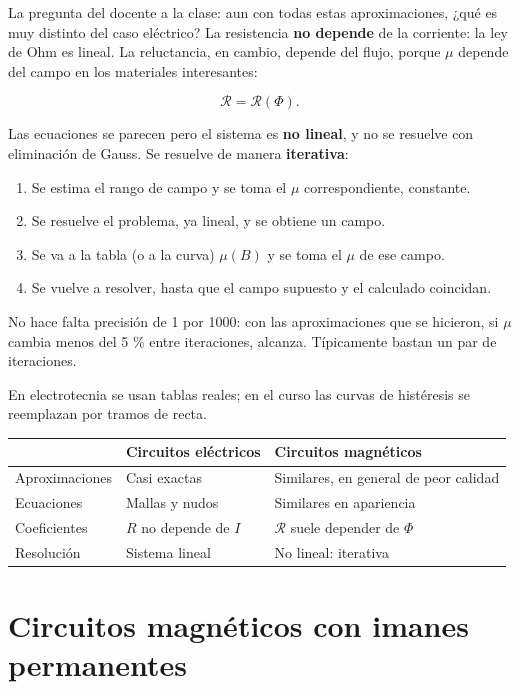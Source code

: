 \documentclass[12pt,a4paper]{article}
\begin{document}
La pregunta del docente a la clase: aun con todas estas aproximaciones, ¿qué es
muy distinto del caso eléctrico? La resistencia \textbf{no depende} de la corriente:
la ley de Ohm es lineal. La reluctancia, en cambio, depende del flujo, porque
$\mu$ depende del campo en los materiales interesantes:

\[
\mathcal{R} = \mathcal{R}(\Phi) .
\]

Las ecuaciones se parecen pero el sistema es \textbf{no lineal}, y no se resuelve
con eliminación de Gauss. Se resuelve de manera \textbf{iterativa}:

\begin{enumerate}
  \item Se estima el rango de campo y se toma el $\mu$ correspondiente, constante.
  \item Se resuelve el problema, ya lineal, y se obtiene un campo.
  \item Se va a la tabla (o a la curva) $\mu(B)$ y se toma el $\mu$ de ese campo.
  \item Se vuelve a resolver, hasta que el campo supuesto y el calculado coincidan.
\end{enumerate}

No hace falta precisión de 1 por 1000: con las aproximaciones que se hicieron,
si $\mu$ cambia menos del 5 \% entre iteraciones, alcanza. Típicamente bastan un
par de iteraciones.

En electrotecnia se usan tablas reales; en el curso las curvas de histéresis se
reemplazan por tramos de recta.

\begin{center}
\renewcommand{\arraystretch}{1.35}
\small
\begin{tabularx}{\textwidth}{l>{\raggedright\arraybackslash}X>{\raggedright\arraybackslash}X}
\toprule
 & \textbf{Circuitos eléctricos} & \textbf{Circuitos magnéticos} \\
\midrule
Aproximaciones & Casi exactas & Similares, en general de peor calidad \\
Ecuaciones & Mallas y nudos & Similares en apariencia \\
Coeficientes & $R$ no depende de $I$ & $\mathcal{R}$ suele depender de $\Phi$ \\
Resolución & Sistema lineal & No lineal: iterativa \\
\bottomrule
\end{tabularx}
\end{center}

\section{Circuitos magnéticos con imanes permanentes}
\end{document}
